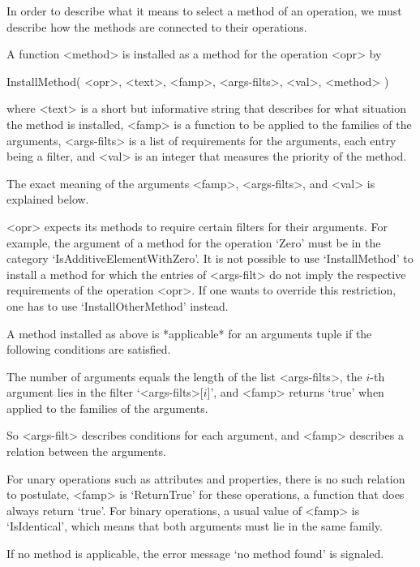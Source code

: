 
In order to describe what it means to select a method of an operation,
we must describe how the methods are connected to their operations.

A function <method> is installed as a method for the operation <opr> by

\>InstallMethod( <opr>, <text>, <famp>, <args-filts>, <val>, <method> )

where <text> is a short but informative string that describes for what
situation the method is installed,
<famp> is a function to be applied to the families of the arguments,
<args-filts> is a list of requirements for the arguments,
each entry being a filter,
and <val> is an integer that measures the priority of the method.

The exact meaning of the arguments <famp>, <args-filts>, and <val>
is explained below.

<opr> expects its methods to require certain filters for their arguments.
For example, the argument of a method for the operation `Zero' must be
in the category `IsAdditiveElementWithZero'.
It is not possible to use `InstallMethod' to install a method for which
the entries of <args-filt> do not imply the respective requirements of
the operation <opr>.
If one wants to override this restriction,
one has to use `InstallOtherMethod' instead.



A method installed as above is *applicable* for an arguments tuple
if the following conditions are satisfied.

The number of arguments equals the length of the list <args-filts>,
the $i$-th argument lies in the filter `<args-filts>[$i$]',
and <famp> returns `true' when applied to the families of the arguments.

So <args-filt> describes conditions for each argument,
and <famp> describes a relation between the arguments.

For unary operations such as attributes and properties,
there is no such relation to postulate,
<famp> is `ReturnTrue' for these operations,
a function that does always return `true'.
For binary operations, a usual value of <famp> is `IsIdentical',
which means that both arguments must lie in the same family.

If no method is applicable,
the error message `no method found' is signaled.

